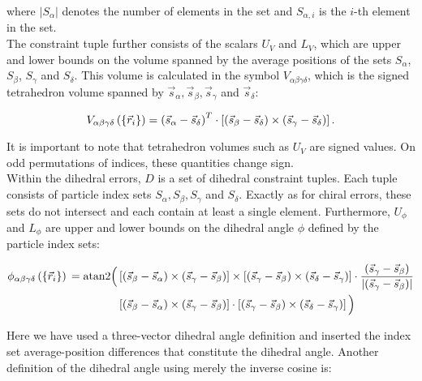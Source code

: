 \documentclass[a4paper]{article}
\begin{document}
where $|S_\alpha|$ denotes the number of elements in the set and $S_{\alpha,
i}$ is the $i$-th element in the set.\\

The constraint tuple further consists of the scalars $U_{V}$ and
$L_{V}$, which are upper and lower bounds on
the volume spanned by the average positions of the sets $S_\alpha$, $S_\beta$,
$S_\gamma$ and $S_\delta$. This volume is
calculated in the symbol $V_{\alpha\beta\gamma\delta}$, which is the signed
tetrahedron volume spanned by $\vec{s}_\alpha, \vec{s}_\beta, \vec{s}_\gamma$
and $\vec{s}_\delta$:

\begin{equation}
  V_{\alpha\beta\gamma\delta}\left( \left\{\vec{r}_i \right\} \right) =
    \left(\vec{s}_{\alpha}-\vec{s}_{\delta}\right)^{T} \cdot \left[ \left(\vec{s}_{\beta}-\vec{s}_{\delta}\right) \times\left(\vec{s}_{\gamma}-\vec{s}_{\delta}\right) \right].
\end{equation}

It is important to note that tetrahedron volumes such as
$U_{V}$ are signed values. On odd permutations of indices, these quantities
change sign.\\

Within the dihedral errors, $D$ is a set of dihedral constraint tuples.
Each tuple consists of particle index sets $S_\alpha, S_\beta, S_\gamma$ and
$S_\delta$. Exactly as for chiral errors, these sets do not intersect and each
contain at least a single element. Furthermore, $U_{\phi}$ and $L_{\phi}$ are
upper and lower bounds on the dihedral angle $\phi$ defined by the particle
index sets:

\begin{align}\begin{aligned}
  \phi_{\alpha\beta\gamma\delta}\left(\left\{\vec{r}_i \right\}\right){} = \textrm{atan2} \Big( &
    \left[
      \left(\vec{s}_{\beta}-\vec{s}_{\alpha}\right) \times \left(\vec{s}_{\gamma}-\vec{s}_{\beta}\right)
    \right] \times \left[
      \left(\vec{s}_{\gamma}-\vec{s}_{\beta}\right) \times \left(\vec{s}_{\delta}-\vec{s}_{\gamma}\right)
    \right] \cdot 
    \frac{\left(\vec{s}_{\gamma}-\vec{s}_{\beta}\right)}{\lvert\left(\vec{s}_{\gamma}-\vec{s}_{\beta}\right)\rvert}\\
    & \left[
      \left(\vec{s}_{\beta}-\vec{s}_{\alpha}\right) \times \left(\vec{s}_{\gamma}-\vec{s}_{\beta}\right)
    \right] \cdot \left[
      \left(\vec{s}_{\gamma}-\vec{s}_{\beta}\right) \times \left(\vec{s}_{\delta}-\vec{s}_{\gamma}\right)
    \right]
  \Big)
\end{aligned}\end{align}

Here we have used a three-vector dihedral angle definition and inserted
the index set average-position differences that constitute the dihedral angle.
Another definition of the dihedral angle using merely the inverse cosine is:\\
\end{document}

